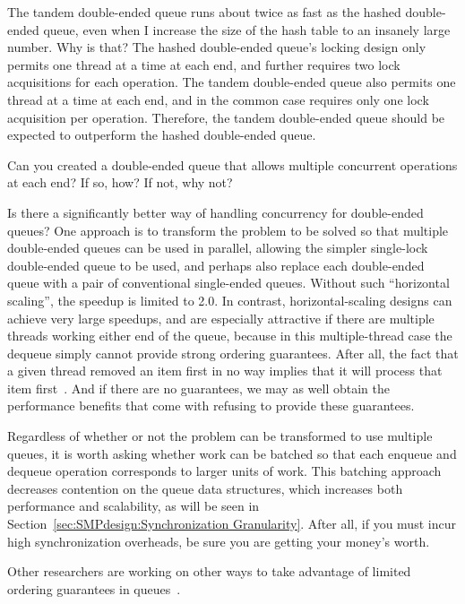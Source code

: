 \begin{enumerate}
\QuickQ{}
	The tandem double-ended queue runs about twice as fast as
	the hashed double-ended queue, even when I increase the
	size of the hash table to an insanely large number.
	Why is that?
\QuickA{}
	The hashed double-ended queue's locking design only permits
	one thread at a time at each end, and further requires
	two lock acquisitions for each operation.
	The tandem double-ended queue also permits one thread at a time
	at each end, and in the common case requires only one lock
	acquisition per operation.
	Therefore, the tandem double-ended queue should be expected to
	outperform the hashed double-ended queue.

	Can you created a double-ended queue that allows multiple
	concurrent operations at each end?
	If so, how?  If not, why not?

\QuickQ{}
	Is there a significantly better way of handling concurrency
	for double-ended queues?
\QuickA{}
	One approach is to transform the problem to be solved
	so that multiple double-ended queues can be used in parallel,
	allowing the simpler single-lock double-ended queue to be used,
	and perhaps also replace each double-ended queue with a pair of
	conventional single-ended queues.
	Without such ``horizontal scaling'', the speedup is limited
	to 2.0.
	In contrast, horizontal-scaling designs can achieve very large
	speedups, and are especially attractive if there are multiple threads
	working either end of the queue, because in this
	multiple-thread case the dequeue
	simply cannot provide strong ordering guarantees.
	After all, the fact that a given thread removed an item first
	in no way implies that it will process that item
	first~\cite{AndreasHaas2012FIFOisnt}.
	And if there are no guarantees, we may as well obtain the
	performance benefits that come with refusing to provide these
	guarantees.

	Regardless of whether or not the problem can be transformed
	to use multiple queues, it is worth asking whether work can
	be batched so that each enqueue and dequeue operation corresponds
	to larger units of work.
	This batching approach decreases contention on the queue data
	structures, which increases both performance and scalability,
	as will be seen in
	Section~\ref{sec:SMPdesign:Synchronization Granularity}.
	After all, if you must incur high synchronization overheads,
	be sure you are getting your money's worth.

	Other researchers are working on other ways to take advantage
	of limited ordering guarantees in
	queues~\cite{ChristophMKirsch2012FIFOisntTR}.


\end{enumerate}
